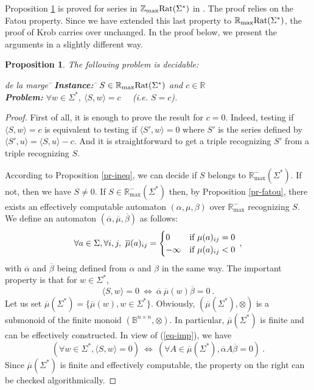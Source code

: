 \documentclass{article}
\newtheorem{prpstn}[thrm]{Proposition}
\newcommand{\mrm}[1]{\text{\rm #1}}
\newcommand{\Z} {\ensuremath{\mathbb{Z}}}
\newcommand{\R} {\ensuremath{\mathbb{R}}}
\newcommand{\B} {\ensuremath{\mathbb{B}}}
\newcommand{\Zmax} {\Z_{\max}}
\newcommand{\Rmax} {\R_{\max}}
\newcommand{\1}{\mathbb{1}}
\newcommand{\0}{\mathbb{0}}
\newcommand{\coef}[2]{\langle #1, #2\rangle}
\def\ab{\Sigma}
\begin{document}
Proposition \ref{pr-eq} is proved for series in
$\Zmax\mrm{Rat}(\ab^*)$ in \cite[Proposition 5.1]{krob94}.
The proof relies on the Fatou property. Since
we have extended this last property to $\Rmax\mrm{Rat}(\ab^*)$, the
proof of Krob carries over unchanged. In the proof below, we present
the arguments in a slightly different way. 

\begin{prpstn}
\label{pr-eq}
The following problem is decidable:
\begin{tabbing} 
de la marge \= \kill
\> {\bf Instance:} \hspace*{0.4cm} \= $S\in \Rmax\mrm{Rat}(\ab^*)$ and
$c\in \R$ \\
\>  {\bf Problem:} \> $\forall w\in \ab^*,  \ \coef{S}{w} = c$ \ \
(i.e. $S=c$)\:.
\end{tabbing}
\end{prpstn} 

\begin{proof}
First of all, it is enough to prove the result for $c=0$. Indeed,
testing if $\coef{S}{w}=c$ is equivalent to testing if
$\coef{S'}{w}=0$ where $S'$ is  
the series defined by $\coef{S'}{u}=\coef{S}{u} - c$. And it is
straightforward to get a triple recognizing $S'$ from a triple
recognizing $S$. 

According to 
Proposition \ref{pr-ineq}, we can decide if $S$ belongs to
$\Rmax^-(\ab^*)$. If not, then we have $S\neq 0$. If $S \in
\Rmax^-(\ab^*)$ then, by Proposition \ref{pr-fatou}, there exists an
effectively computable automaton $(\alpha, \mu, \beta)$ over $\Rmax^-$ recognizing $S$. 
We define an automaton
$(\overline{\alpha}, \overline{\mu}, 
\overline{\beta})$ as follows: 
\[
\forall a\in \ab, \forall i, j, \ \overline{\mu}(a)_{ij}= 
\begin{cases}
0 & \mrm{if } \mu(a)_{ij}= 0 \\
-\infty & \mrm{if }  \mu(a)_{ij} < 0 
\end{cases}\:,
\]
with $\overline{\alpha}$ and $\overline{\beta}$ being defined from
$\alpha$ and $\beta$ in the same
way. 
The important property is that for $w\in \ab^*$, 
\begin{equation}\label{eq-imp}
\coef{S}{w} = 0 \ \iff \ \overline{\alpha} \ \overline{\mu}(w)
\overline{\beta} =0 \:.
\end{equation}
Let us set 
$\overline{\mu}(\ab^*) = \{\overline{\mu}(w), w\in
\ab^*\}$. Obviously, $(\overline{\mu}(\ab^*), \otimes)$ is a submonoid
of the finite monoid $(\B^{n\times n}, \otimes)$. In particular,
$\overline{\mu}(\ab^*)$ is finite and can be effectively
constructed. In view of (\ref{eq-imp}), we have
\begin{equation}\label{eq-univ}
\left(\forall w \in \ab^*,  \coef{S}{w} = 0 \right) \ \iff \ 
\left( \forall A \in \overline{\mu}(\ab^*), \overline{\alpha} A
\overline{\beta} = 0 \right)\:. 
\end{equation}
Since $\overline{\mu}(\ab^*)$ is finite and effectively computable,
the property on the right can be checked algorithmically. 
\end{proof}
\end{document}
